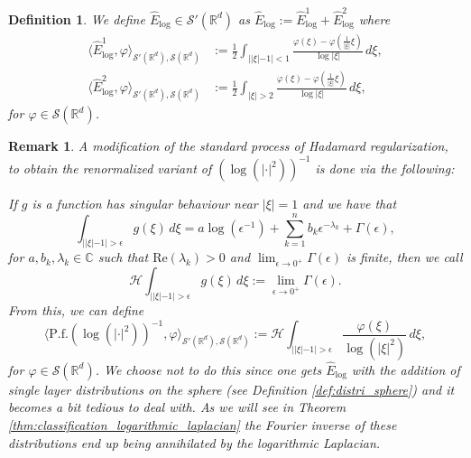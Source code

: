 \documentclass[11pt]{amsart}
\newcommand{\R}{\mathbb{R}}
\newtheorem{definition}{Definition}
\newtheorem{remark}{Remark}
\begin{document}
\begin{definition}
	We define $\hat{E}_{\log}\in \mathcal{S}'(\R^d)$ as $\hat{E}_{\log}:=\hat{E}_{\log}^{1}+\hat{E}_{\log}^{2}$ where 
	\begin{equation*}
	\begin{split}
		\langle \hat{E}_{\log}^{1},\varphi\rangle_{\mathcal{S}'(\R^d),\mathcal{S}(\R^d)}
		&:=\frac{1}{2}\int_{||\xi|-1|<1}\frac{\varphi(\xi)-\varphi(\tfrac{1}{|\xi|}\xi)}{\log|\xi|}\,d\xi,\\
		\langle \hat{E}_{\log}^{2},\varphi\rangle_{\mathcal{S}'(\R^d),\mathcal{S}(\R^d)}
		&:=\frac{1}{2}\int_{|\xi|>2}\frac{\varphi(\xi)-\varphi(\tfrac{1}{|\xi|}\xi)}{\log|\xi|}\,d\xi,
	\end{split}
	\end{equation*}
	for $\varphi \in \mathcal{S}(\R^d)$. 
\end{definition}

\begin{remark}
	A modification of the standard process of Hadamard regularization, to obtain the renormalized variant of $(\log(|\cdot|^2))^{-1}$ is done via the following: 
	
	If $g$ is a function has singular behaviour near $|\xi|=1$ and we have that 
	\begin{equation*}
		\int_{||\xi|-1|>\epsilon}g(\xi)\,d\xi=a\log(\epsilon^{-1})+\sum_{k=1}^{n}b_{k}\epsilon^{-\lambda_{k}}+\Gamma(\epsilon),
	\end{equation*}
	for $a,b_{k},\lambda_{k}\in\mathbb{C}$ such that $\text{Re}(\lambda_{k})>0$ and $\lim_{\epsilon\rightarrow 0^{+}}\Gamma(\epsilon)$ is finite, then we call
	\begin{equation*}
		\mathcal{H}\int_{||\xi|-1|>\epsilon}g(\xi)\,d\xi:=\lim_{\epsilon\rightarrow 0^{+}}\Gamma(\epsilon). 
	\end{equation*}
	From this, we can define 
	\begin{equation*}
		\langle \textrm{P.f.}(\log(|\cdot|^2))^{-1},\varphi\rangle_{\mathcal{S}'(\R^d),\mathcal{S}(\R^d)}:=\mathcal{H}\int_{||\xi|-1|>\epsilon}\frac{\varphi(\xi)}{\log(|\xi|^2)}\,d\xi,
	\end{equation*}
	for $\varphi \in \mathcal{S}(\R^d)$. We choose not to do this since one gets $\hat{E}_{\log}$ with the addition of single layer distributions on the sphere (see Definition \ref{def:distri_sphere}) and it becomes a bit tedious to deal with. As we will see in Theorem \ref{thm:classification_logarithmic_laplacian} the Fourier inverse of these distributions end up being annihilated by the logarithmic Laplacian. 
\end{remark}
\end{document}
